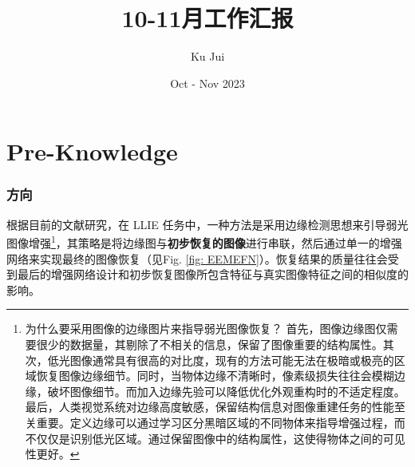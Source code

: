 \documentclass[a4paper, 10pt]{article}
\begin{document}
	
	
	\title{\songti {}10-11月工作汇报}
	\author{\textrm{Ku Jui}}
	\date{\textrm{Oct - Nov 2023}}
	\maketitle
	
	\renewcommand{\figurename}{Figure} %
	
	\renewcommand{\tablename}{Table}
	
	\renewcommand{\cfttoctitlefont}{\hfill\Large\bfseries\songti}
	\renewcommand{\cftaftertoctitle}{\hfill}
	\renewcommand{\contentsname}{Content}
		
	\tableofcontents
	
	
	\part{Pre-Knowledge}	
	
	\section{方向}
		
		根据目前的文献研究，在 LLIE 任务中，一种方法是采用边缘检测思想来引导弱光图像增强\footnote{为什么要采用图像的边缘图片来指导弱光图像恢复？
		首先，图像边缘图仅需要很少的数据量，其剔除了不相关的信息，保留了图像重要的结构属性。其次，低光图像通常具有很高的对比度，现有的方法可能无法在极暗或极亮的区域恢复图像边缘细节。同时，当物体边缘不清晰时，像素级损失往往会模糊边缘，破坏图像细节。而加入边缘先验可以降低优化外观重构时的不适定程度。最后，人类视觉系统对边缘高度敏感，保留结构信息对图像重建任务的性能至关重要。定义边缘可以通过学习区分黑暗区域的不同物体来指导增强过程，而不仅仅是识别低光区域。通过保留图像中的结构属性，这使得物体之间的可见性更好。}，其策略是将边缘图与\textbf{初步恢复的图像}进行串联，然后通过单一的增强网络来实现最终的图像恢复（见Fig. \ref{fig: EEMEFN}）。恢复结果的质量往往会受到最后的增强网络设计和初步恢复图像所包含特征与真实图像特征之间的相似度的影响。
		
\end{document}
